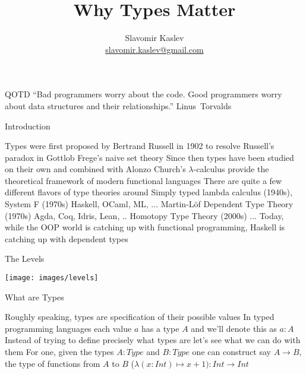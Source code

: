 \documentclass[pdf]{beamer}
\title{Why Types Matter}
\author{Slavomir Kaslev \\
  \href{mailto:slavomir.kaslev@gmail.com}{slavomir.kaslev@gmail.com}}
\begin{document}
\begin{frame}
  \titlepage
\end{frame}

\begin{frame}{QOTD}
  ``Bad programmers worry about the code. Good programmers worry about data structures and their relationships.'' \mbox{Linus Torvalds}
\end{frame}

\begin{frame}{Introduction}
  \begin{outline}
    \1 Types were first proposed by Bertrand Russell in 1902 to resolve Russell's paradox in Gottlob Frege's naive set theory
    \pause
    \1 Since then types have been studied on their own and combined with Alonzo Church's $\lambda$-calculus
    provide the theoretical framework of modern functional languages
    \pause
    \1 There are quite a few different flavors of type theories around
    \pause
    \2 Simply typed lambda calculus (1940s), System F (1970s)
    \3 Haskell, OCaml, ML, ...
    \pause
    \2 Martin-Löf Dependent Type Theory (1970s)
    \3 Agda, Coq, Idris, Lean, ..
    \pause
    \2 Homotopy Type Theory (2000s)
    \pause
    \2 ...
    \pause
    \1 Today, while the OOP world is catching up with functional programming, Haskell is catching up with dependent types
  \end{outline}
\end{frame}

\begin{frame}{The Levels}
  \begin{center}
    \texttt{[image: images/levels]}
  \end{center}
\end{frame}

\begin{frame}{What are Types}
  \begin{outline}
    \1 Roughly speaking, types are specification of their possible values
    \pause
    \1 In typed programming languages each value $a$ has a type $A$ and we'll denote this as $a : A$
    \pause
    \1 Instead of trying to define precisely what types are let's see what we can do with them
    \pause
    \1 For one, given the types $A : Type$ and $B : Type$ one can construct say $A \to B$, the type of functions from $A$ to $B$
    \pause
    \1 ($\lambda (x : Int) \mapsto x + 1) : Int \to Int$
  \end{outline}
\end{frame}
\end{document}
